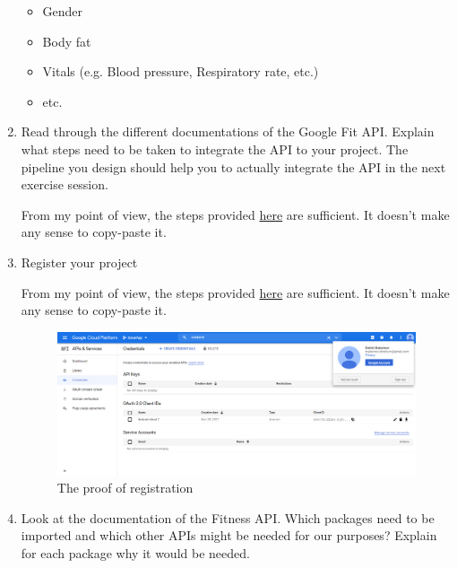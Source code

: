\documentclass{homework}
\begin{document}
\begin{enumerate}
	\begin{itemize}
		\item Gender
		\item Body fat
		\item Vitals (e.g. Blood pressure, Respiratory rate, etc.)
		\item etc.
	\end{itemize}
	\item Read through the different documentations of the Google Fit API. Explain what steps need to be taken to integrate the API to your project. The pipeline you design should help you to actually integrate the API in the next exercise session.

	From my point of view, the steps provided \href{https://developers.google.com/fit/android/get-started}{here} are sufficient. It doesn't make any sense to copy-paste it.
	\item Register your project

	From my point of view, the steps provided \href{https://developers.google.com/fit/android/get-api-key}{here} are sufficient. It doesn't make any sense to copy-paste it.
		\begin{figure}[hbt!]
			\centering
			\includegraphics[width=1.\textwidth]{GReg.png}
			\caption{The proof of registration}
		\end{figure}

	\item Look at the documentation of the Fitness API. Which packages need to be imported and which other APIs might be needed for our purposes? Explain for each package why it would be needed.


\end{enumerate}
\end{document}
